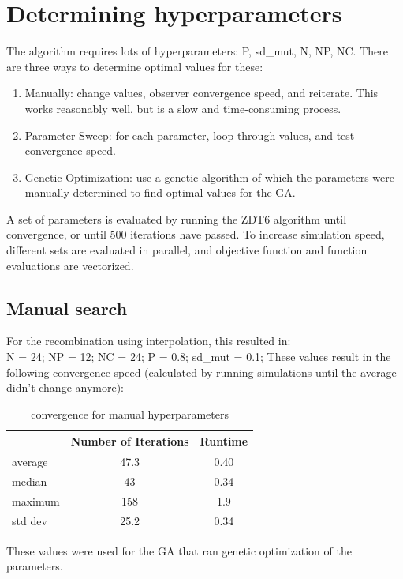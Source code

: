 \section{Determining hyperparameters} \label{hyperparameters}
The algorithm requires lots of hyperparameters: P, sd_mut, N, NP, NC. There are three ways to determine optimal values for these:
\begin{enumerate}
\item Manually: change values, observer convergence speed, and reiterate. This works reasonably well, but is a slow and time-consuming process.
\item Parameter Sweep: for each parameter, loop through values, and test convergence speed.
\item Genetic Optimization: use a genetic algorithm of which the parameters were manually determined to find optimal values for the GA.
\end{enumerate}
A set of parameters is evaluated by running the ZDT6 algorithm until convergence, or until 500 iterations have passed. To increase simulation speed, different sets are evaluated in parallel, and objective function and function evaluations are vectorized.

\subsection{Manual search}
For the recombination using interpolation, this resulted in:\\
N = 24;         %
NP = 12;       %
NC = 24;       %
P = 0.8;	%
sd_mut = 0.1; %
These values result in the following convergence speed (calculated by running simulations until the average didn't change anymore):
\begin{table}[H]
\centering
\begin{tabular}{|l|c|c| }
\hline
& Number of Iterations	& Runtime \\
\hline
average    &      47.3   &   0.40 \\
median      &     43      &      0.34    \\
maximum		&	 158      &     1.9  \\
std dev  &   25.2   &   0.34   \\
\hline
\end{tabular}
\caption{convergence for manual hyperparameters}
\label{manualConvergence}
\end{table}
These values were used for the GA that ran genetic optimization of the parameters.

